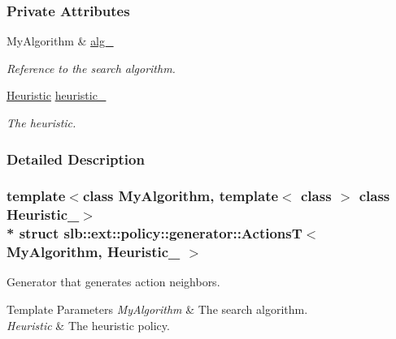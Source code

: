 \subsubsection*{Private Attributes}
\begin{DoxyCompactItemize}
\item 
My\+Algorithm \& \hyperlink{structslb_1_1ext_1_1policy_1_1generator_1_1ActionsT_ad687b061ad2c0f5b4a4e3dc37da2b4de}{alg\+\_\+}\hypertarget{structslb_1_1ext_1_1policy_1_1generator_1_1ActionsT_ad687b061ad2c0f5b4a4e3dc37da2b4de}{}\label{structslb_1_1ext_1_1policy_1_1generator_1_1ActionsT_ad687b061ad2c0f5b4a4e3dc37da2b4de}

\begin{DoxyCompactList}\small\item\em Reference to the search algorithm. \end{DoxyCompactList}\item 
\hyperlink{structslb_1_1ext_1_1policy_1_1generator_1_1ActionsT_aa2fb932f95630f59a094330787f12a7b}{Heuristic} \hyperlink{structslb_1_1ext_1_1policy_1_1generator_1_1ActionsT_ada3eb14aeacba5f3986c5c3a3ed83d2b}{heuristic\+\_\+}\hypertarget{structslb_1_1ext_1_1policy_1_1generator_1_1ActionsT_ada3eb14aeacba5f3986c5c3a3ed83d2b}{}\label{structslb_1_1ext_1_1policy_1_1generator_1_1ActionsT_ada3eb14aeacba5f3986c5c3a3ed83d2b}

\begin{DoxyCompactList}\small\item\em The heuristic. \end{DoxyCompactList}\end{DoxyCompactItemize}


\subsubsection{Detailed Description}
\subsubsection*{template$<$class My\+Algorithm, template$<$ class $>$ class Heuristic\+\_\+$>$\\*
struct slb\+::ext\+::policy\+::generator\+::\+Actions\+T$<$ My\+Algorithm, Heuristic\+\_\+ $>$}

Generator that generates action neighbors. 


\begin{DoxyTemplParams}{Template Parameters}
{\em My\+Algorithm} & The search algorithm. \\
\hline
{\em Heuristic} & The heuristic policy. \\
\hline
\end{DoxyTemplParams}


